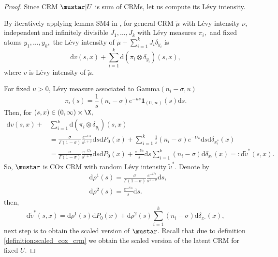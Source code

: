 \begin{proof}
    

Since CRM $\mustar |U$ is sum of CRMs, let us compute its L\'evy intensity. 

By iteratively applying lemma SM$4$ in \cite{catalano2023merging}, for general CRM $\tilde{\mu}$ with L\'evy intensity $\nu$, independent and infinitely divisible $J_1,\dots, J_k$ with L\'evy measures $\pi_i,$ and fixed atoms $y_1,\dots, y_k,$ the L\'evy intensity of $\tilde{\mu} + \sum_{i = 1}^k J_i \delta_{y_i}$ is 
\[
\mathrm{d}v(s,x) + \sum_{i = 1}^k \mathrm{d}\left( \pi_i \otimes \delta_{y_i} \right)(s,x), 
\]
where $v$ is L\'evy intensity of $\tilde{\mu}.$

For fixed $u > 0$, L\'evy measure associated to $\mathrm{Gamma}\left(n_i - \sigma, u\right)$
\[
\pi_i(s) = \frac{1}{s}(n_i - \sigma) e^{-us}\mathbf{1}_{(0,\infty)}(s)\mathrm{d}s.
\]
Then, for $(s,x) \in (0,\infty)\times\X,$ 
\begin{align*}
    \mathrm{d}v(s,x) + &\sum_{i = 1}^k \mathrm{d}\left( \pi_i \otimes \delta_{y_i} \right)(s,x)  \\
    & = \frac{ \sigma}{\Gamma(1-\sigma)}\frac{e^{-Us}}{s^{1+\sigma}}\mathrm{d}s \mathrm{d}P_0(x) + \sum_{i=1}^k \frac{1}{s}(n_i - \sigma)e^{-Us}\mathrm{d}s\mathrm{d}\delta_{x_i^*}(x) \\
    & = \frac{\sigma}{\Gamma(1-\sigma)}\frac{e^{-Us}}{s^{1+\sigma}}\mathrm{d}s \mathrm{d}P_0(x)  +\frac{e^{-Us}}{s}\mathrm{d}s\sum_{i = 1}^k (n_i - \sigma)\mathrm{d}\delta_{x_{^*}}(x)=: \mathrm{d}\tilde{v}^*(s,x).
\end{align*}
So, $\mustar$ is COx CRM with random L\'evy intensity $\tilde{v}^*.$ Denote by 
\begin{align}
    & \mathrm{d}\rho^1(s) = \frac{ \sigma}{\Gamma(1-\sigma)}\frac{e^{-Us}}{s^{1+\sigma}}\mathrm{d}s,\\
    & \mathrm{d}\rho^2(s) = \frac{e^{-Us}}{s}\mathrm{d}s.
\end{align}
then, 
\[
\mathrm{d}\tilde{v}^*(s,x) = \mathrm{d}\rho^1(s)\mathrm{d}P_0(x) + \mathrm{d}\rho^2(s)\sum_{i = 1}^k (n_i - \sigma)\mathrm{d}\delta_{x_{^*}}(x),
\]
next step is to obtain the scaled version of $\mustar$. Recall that due to definition \ref{definition:scaled_cox_crm} we obtain the scaled version of the latent CRM for fixed $U.$


\end{proof}
